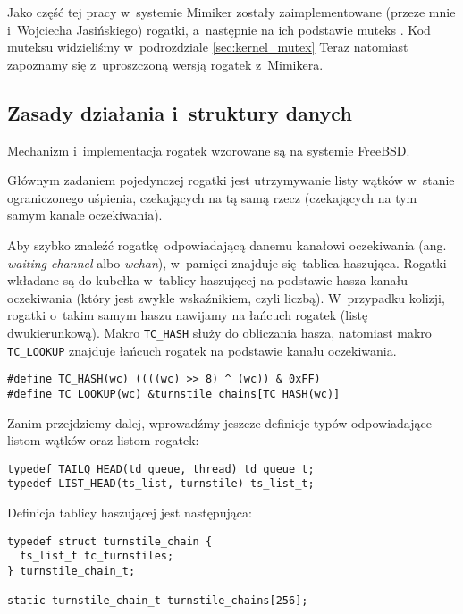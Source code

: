 \documentclass[shortabstract]{iithesis}
\theoremstyle{definition} \newtheorem*{definition}{Definicja}
\theoremstyle{definition} \newtheorem*{example}{Przykład}
\theoremstyle{definition} \newtheorem*{remark}{Uwaga}
\begin{document}
Jako część tej pracy w~systemie Mimiker zostały zaimplementowane (przeze mnie i~Wojciecha Jasińskiego)
rogatki, a~następnie na ich podstawie muteks \cite{bib:turnstile-pr1} \cite{bib:turnstile-pr2}
\cite{bib:turnstile-pr3} \cite{bib:turnstile-pr4}.
Kod muteksu widzieliśmy w~podrozdziale \ref{sec:kernel_mutex}
Teraz natomiast zapoznamy się z~uproszczoną wersją rogatek z~Mimikera.

\subsection{Zasady działania i~struktury danych}

Mechanizm i~implementacja rogatek wzorowane są na systemie FreeBSD.

Głównym zadaniem pojedynczej rogatki jest utrzymywanie listy wątków w~stanie ograniczonego uśpienia,
czekających na tą samą rzecz (czekających na tym samym kanale oczekiwania).

Aby szybko znaleźć rogatkę odpowiadającą danemu kanałowi oczekiwania (ang. \textit{waiting channel}
albo \textit{wchan}), w~pamięci znajduje się tablica haszująca. Rogatki wkładane są do kubełka w~tablicy
haszującej na podstawie hasza kanału oczekiwania (który jest zwykle wskaźnikiem, czyli liczbą). W~przypadku
kolizji, rogatki o~takim samym haszu nawijamy na łańcuch rogatek (listę dwukierunkową). Makro
\texttt{TC\_HASH} służy do obliczania hasza, natomiast makro \texttt{TC\_LOOKUP} znajduje łańcuch rogatek
na podstawie kanału oczekiwania.

\begin{lstlisting}
#define TC_HASH(wc) ((((wc) >> 8) ^ (wc)) & 0xFF)
#define TC_LOOKUP(wc) &turnstile_chains[TC_HASH(wc)]
\end{lstlisting}

Zanim przejdziemy dalej, wprowadźmy jeszcze definicje typów odpowiadające
listom wątków oraz listom rogatek:

\begin{lstlisting}
typedef TAILQ_HEAD(td_queue, thread) td_queue_t;
typedef LIST_HEAD(ts_list, turnstile) ts_list_t;
\end{lstlisting}

Definicja tablicy haszującej jest następująca:

\begin{lstlisting}
typedef struct turnstile_chain {
  ts_list_t tc_turnstiles;
} turnstile_chain_t;

static turnstile_chain_t turnstile_chains[256];
\end{lstlisting}
\end{document}
